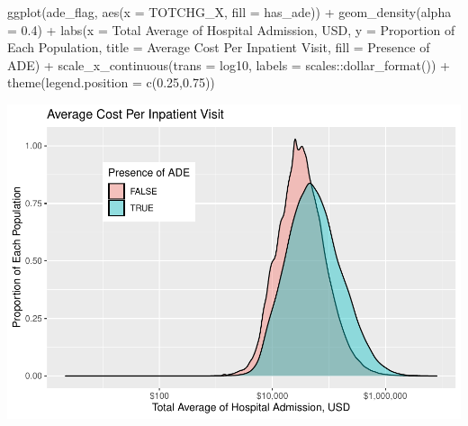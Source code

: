 \documentclass[preprint, 3p,
authoryear]{elsarticle} %
\newenvironment{Shaded}{\begin{snugshade}}{\end{snugshade}}
\newcommand{\AttributeTok}[1]{\textcolor[rgb]{0.77,0.63,0.00}{#1}}
\newcommand{\FloatTok}[1]{\textcolor[rgb]{0.00,0.00,0.81}{#1}}
\newcommand{\FunctionTok}[1]{\textcolor[rgb]{0.00,0.00,0.00}{#1}}
\newcommand{\NormalTok}[1]{#1}
\newcommand{\SpecialCharTok}[1]{\textcolor[rgb]{0.00,0.00,0.00}{#1}}
\newcommand{\StringTok}[1]{\textcolor[rgb]{0.31,0.60,0.02}{#1}}
\begin{document}
\begin{Shaded}
\begin{Highlighting}[]
\FunctionTok{ggplot}\NormalTok{(ade\_flag, }\FunctionTok{aes}\NormalTok{(}\AttributeTok{x =}\NormalTok{ TOTCHG\_X, }\AttributeTok{fill =}\NormalTok{ has\_ade)) }\SpecialCharTok{+}
  \FunctionTok{geom\_density}\NormalTok{(}\AttributeTok{alpha =} \FloatTok{0.4}\NormalTok{) }\SpecialCharTok{+}
  \FunctionTok{labs}\NormalTok{(}\AttributeTok{x =} \StringTok{\textquotesingle{}Total Average of Hospital Admission, USD\textquotesingle{}}\NormalTok{, }\AttributeTok{y =} \StringTok{\textquotesingle{}Proportion of Each Population\textquotesingle{}}\NormalTok{, }\AttributeTok{title =} \StringTok{\textquotesingle{}Average Cost Per Inpatient Visit\textquotesingle{}}\NormalTok{, }\AttributeTok{fill =} \StringTok{\textquotesingle{}Presence of ADE\textquotesingle{}}\NormalTok{) }\SpecialCharTok{+}
  \FunctionTok{scale\_x\_continuous}\NormalTok{(}\AttributeTok{trans =} \StringTok{\textquotesingle{}log10\textquotesingle{}}\NormalTok{, }\AttributeTok{labels =}\NormalTok{ scales}\SpecialCharTok{::}\FunctionTok{dollar\_format}\NormalTok{()) }\SpecialCharTok{+}
  \FunctionTok{theme}\NormalTok{(}\AttributeTok{legend.position =} \FunctionTok{c}\NormalTok{(}\FloatTok{0.25}\NormalTok{,}\FloatTok{0.75}\NormalTok{))}
\end{Highlighting}
\end{Shaded}

\includegraphics{final-project-paper_files/figure-latex/charge-plot-1.pdf}
\end{document}
